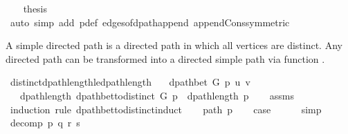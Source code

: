 \begin{isabellebody}
\ \ \isamarkupfalse%
\ {\isacharquery}{\kern0pt}thesis\isanewline
\ \ \ \ \isamarkupfalse%
\ {\isacharparenleft}{\kern0pt}auto\ simp\ add{\isacharcolon}{\kern0pt}\ p{\isacharunderscore}{\kern0pt}def\ edges{\isacharunderscore}{\kern0pt}of{\isacharunderscore}{\kern0pt}dpath{\isacharunderscore}{\kern0pt}append{\isacharunderscore}{\kern0pt}{}\ append{\isacharunderscore}{\kern0pt}Cons{\isacharbrackleft}{\kern0pt}symmetric{\isacharbrackright}{\kern0pt}{\isacharparenright}{\kern0pt}\isanewline
{}\isamarkupfalse%
%
\endisatagproof
{\isafoldproof}%
%
\isadelimproof
%
\endisadelimproof
%
\begin{isamarkuptext}%
A simple directed path is a directed path in which all vertices are distinct. Any directed path can
be transformed into a directed simple path via function .%
\end{isamarkuptext}\isamarkuptrue%
\isamarkupfalse%
\ distinct{\isacharunderscore}{\kern0pt}dpath{\isacharunderscore}{\kern0pt}length{\isacharunderscore}{\kern0pt}le{\isacharunderscore}{\kern0pt}dpath{\isacharunderscore}{\kern0pt}length{\isacharcolon}{\kern0pt}\isanewline
\ \ \ {\isachardoublequoteopen}dpath{\isacharunderscore}{\kern0pt}bet\ G\ p\ u\ v{\isachardoublequoteclose}\isanewline
\ \ \ {\isachardoublequoteopen}dpath{\isacharunderscore}{\kern0pt}length\ {\isacharparenleft}{\kern0pt}dpath{\isacharunderscore}{\kern0pt}bet{\isacharunderscore}{\kern0pt}to{\isacharunderscore}{\kern0pt}distinct\ G\ p{\isacharparenright}{\kern0pt}\ {\isasymle}\ dpath{\isacharunderscore}{\kern0pt}length\ p{\isachardoublequoteclose}\isanewline
%
\isadelimproof
\ \ %
\endisadelimproof
%
\isatagproof
{}\isamarkupfalse%
\ assms\isanewline
{}\isamarkupfalse%
\ {\isacharparenleft}{\kern0pt}induction\ rule{\isacharcolon}{\kern0pt}\ dpath{\isacharunderscore}{\kern0pt}bet{\isacharunderscore}{\kern0pt}to{\isacharunderscore}{\kern0pt}distinct{\isacharunderscore}{\kern0pt}induct{\isacharparenright}{\kern0pt}\isanewline
\ \ \isamarkupfalse%
\ {\isacharparenleft}{\kern0pt}path\ p{\isacharparenright}{\kern0pt}\isanewline
\ \ \isamarkupfalse%
\ {\isacharquery}{\kern0pt}case\isanewline
\ \ \ \ \isamarkupfalse%
\ simp\isanewline
{}\isamarkupfalse%
\isanewline
\ \ \isamarkupfalse%
\ {\isacharparenleft}{\kern0pt}decomp\ p\ q\ r\ s{\isacharparenright}{\kern0pt}\isanewline

\end{isabellebody}
